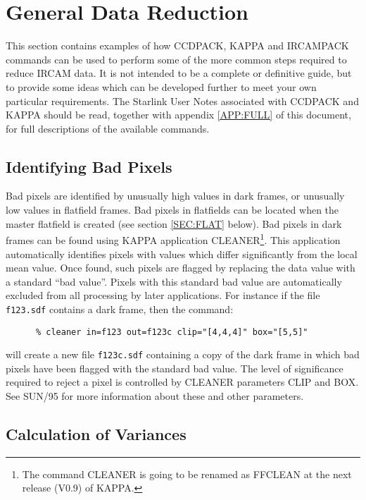 \section{General Data Reduction}
\label{SEC:GEN}

This section contains examples of how {\small CCDPACK}, {\small KAPPA}
and {\small IRCAMPACK} commands can be used to perform some of the more
common steps required to reduce {\small IRCAM} data. It is not intended
to be a complete or definitive guide, but to provide some ideas which
can be developed further to meet your own particular requirements. The
Starlink User Notes associated with {\small CCDPACK} and {\small KAPPA}
should be read, together with appendix \ref{APP:FULL} of this document,
for full descriptions of the available commands.

\subsection{Identifying Bad Pixels}

Bad pixels are identified by unusually high values in dark frames, or
unusually low values in flatfield frames. Bad pixels in flatfields can
be located when the master flatfield is created (see section
\ref{SEC:FLAT} below). Bad pixels in dark frames can be found using
{\small KAPPA} application {\small CLEANER}\footnote{The command
CLEANER is going to be renamed as FFCLEAN at the next release (V0.9) of
KAPPA.}. This application automatically identifies pixels with values
which differ significantly from the local mean value. Once found, such
pixels are flagged by replacing the data value with a standard ``bad
value''.  Pixels with this standard bad value are automatically
excluded from all processing by later applications. For instance if the
file \verb+f123.sdf+ contains a dark frame, then the command:

\small
\begin{verbatim}
      % cleaner in=f123 out=f123c clip="[4,4,4]" box="[5,5]" 
\end{verbatim}
\normalsize

will create a new file \verb+f123c.sdf+ containing a copy of the dark
frame in which bad pixels have been flagged with the standard bad
value. The level of significance required to reject a pixel is
controlled by {\small CLEANER} parameters {\small CLIP} and {\small
BOX}. See SUN/95 for more information about these and other
parameters.

\subsection{Calculation of Variances}

